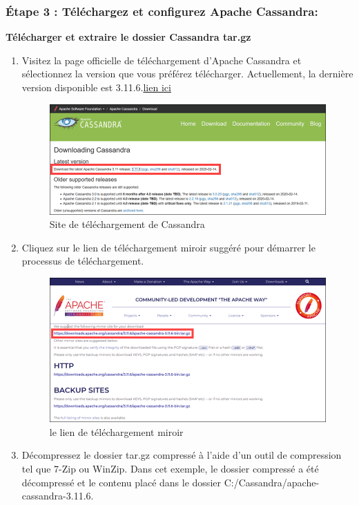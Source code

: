 \subsubsection {Étape 3 : Téléchargez et configurez Apache Cassandra:}

\textbf{Télécharger et extraire le dossier Cassandra tar.gz}

\begin{enumerate}
\item Visitez la page officielle de téléchargement d'Apache Cassandra et sélectionnez la version que vous préférez télécharger. Actuellement, la dernière version disponible est 3.11.6.\href{https://cassandra.apache.org/_/download.html}{lien ici}
\begin{figure}[h]
	\centering
    \includegraphics[scale=0.6]{img/part3/2.2}
    \caption{Site de téléchargement de Cassandra}
\end{figure}
\item Cliquez sur le lien de téléchargement miroir suggéré pour démarrer le processus de téléchargement.
\begin{figure}[h]
	\centering
    \includegraphics[scale=0.5]{img/part3/2.3}
    \caption{le lien de téléchargement miroir}
\end{figure}
\newpage
\item Décompressez le dossier tar.gz compressé à l'aide d'un outil de compression tel que 7-Zip ou WinZip. Dans cet exemple, le dossier compressé a été décompressé et le contenu placé dans le dossier C:/Cassandra/apache-cassandra-3.11.6.

\end{enumerate}
